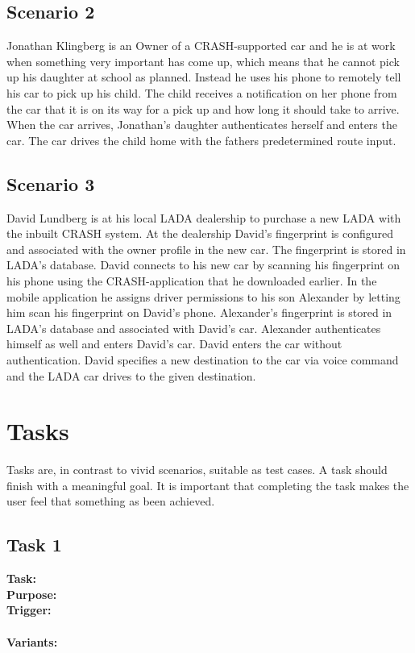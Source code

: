 \documentclass{article}
\begin{document}
\subsection {Scenario 2}
Jonathan Klingberg is an Owner of a CRASH-supported car and he is at work when something very important has come up, which means that he cannot pick up his daughter at school as planned. Instead he uses his phone to remotely tell his car to pick up his child. The child receives a notification on her phone from the car that it is on its way for a pick up and how long it should take to arrive. When the car arrives, Jonathan’s daughter authenticates herself and enters the car. The car drives the child home with the fathers predetermined route input.

\subsection {Scenario 3}
David Lundberg is at his local LADA dealership to purchase a new LADA with the inbuilt CRASH system. At the dealership David’s fingerprint is configured and associated with the owner profile in the new car. The fingerprint is stored in LADA’s database. David connects to his new car by scanning his fingerprint on his phone using the CRASH-application that he downloaded earlier. In the mobile application he assigns driver permissions to his son Alexander by letting him scan his fingerprint on David’s phone. Alexander’s fingerprint is stored in LADA’s database and associated with David’s car. 
Alexander authenticates himself as well and enters David’s car. David enters the car without authentication. David specifies a new destination to the car via voice command and the LADA car drives to the given destination.


\section{Tasks}
Tasks are, in contrast to vivid scenarios, suitable as test cases. A task should finish with a meaningful goal. It is important that completing the task makes the user feel that something as been achieved.
\subsection {Task 1}
\textbf{Task:} \\
\textbf{Purpose:} \\
\textbf{Trigger:} \\
\\
\noindent
\textbf{Variants:}     \\
\tab{ }  \\
\tab{ }  \\
\tab{ }  \\
\tab{ }   
\medskip
\end{document}
